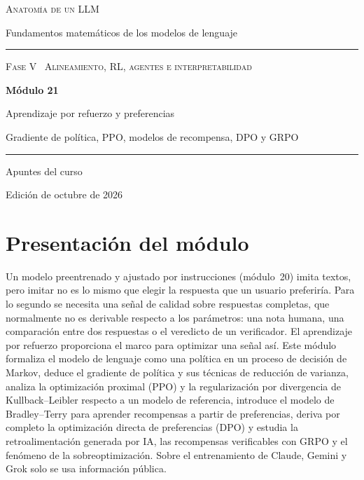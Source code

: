 \documentclass[11pt,a4paper,twoside,openany]{book}
\begin{document}
\frontmatter
\begin{titlepage}
\centering
\vspace*{2.5cm}
{\large\scshape Anatomía de un LLM}\par
\vspace{0.4cm}
{\normalsize Fundamentos matemáticos de los modelos de lenguaje}\par
\vspace{2.2cm}
\rule{\textwidth}{0.8pt}\par\vspace{0.5cm}
{\small\scshape Fase V \textperiodcentered\ Alineamiento, RL, agentes e interpretabilidad}\par\vspace{0.3cm}
{\Huge\bfseries Módulo 21\par}\vspace{0.3cm}
{\LARGE Aprendizaje por refuerzo y preferencias\par}
\vspace{0.2cm}
{\large Gradiente de política, PPO, modelos de recompensa, DPO y GRPO\par}
\vspace{0.5cm}\rule{\textwidth}{0.4pt}\par
\vspace{1.6cm}
{\large Apuntes del curso}\par
\vfill
{\small Edición de octubre de 2026}\par
\end{titlepage}

\chapter*{Presentación del módulo}

Un modelo preentrenado y ajustado por instrucciones (módulo~20) imita textos, pero imitar no es lo mismo que elegir la respuesta que un usuario preferiría. Para lo segundo se necesita una señal de calidad sobre respuestas completas, que normalmente no es derivable respecto a los parámetros: una nota humana, una comparación entre dos respuestas o el veredicto de un verificador. El aprendizaje por refuerzo proporciona el marco para optimizar una señal así. Este módulo formaliza el modelo de lenguaje como una política en un proceso de decisión de Markov, deduce el gradiente de política y sus técnicas de reducción de varianza, analiza la optimización proximal (PPO) y la regularización por divergencia de Kullback--Leibler respecto a un modelo de referencia, introduce el modelo de Bradley--Terry para aprender recompensas a partir de preferencias, deriva por completo la optimización directa de preferencias (DPO) y estudia la retroalimentación generada por IA, las recompensas verificables con GRPO y el fenómeno de la sobreoptimización. Sobre el entrenamiento de Claude, Gemini y Grok solo se usa información pública.
\end{document}
